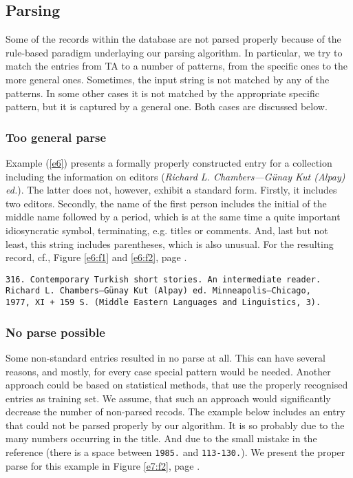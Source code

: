 \documentclass{scrartcl}
\begin{document}
\subsection{Parsing}
Some of the records within the database are not parsed properly because of the
rule-based paradigm underlaying our parsing algorithm. In particular, we try to
match the entries from TA to a number of patterns, from the specific ones to the
more general ones. Sometimes, the input string is not matched by any of the
patterns. In some other cases it is not matched by the appropriate specific
pattern, but it is captured by a general one. Both cases are discussed below.

\subsubsection{Too general parse}
Example (\ref{e6}) presents a formally properly constructed entry for a
collection including the information on editors (\emph{Richard L. Chambers—Günay
Kut (Alpay) ed.}). The latter does not, however, exhibit a standard form.
Firstly, it includes two editors. Secondly, the name of the first person includes the
initial of the middle name followed by a period, which is at the same time a
quite important idiosyncratic symbol, terminating, e.g. titles or comments. And,
last but not least, this string includes parentheses, which is also unusual. For the
resulting record, cf., Figure \ref{e6:f1} and \ref{e6:f2}, page \pageref{e6:f1}.

\begin{example}
\begin{verbatim}
316. Contemporary Turkish short stories. An intermediate reader.
Richard L. Chambers—Günay Kut (Alpay) ed. Minneapolis—Chicago, 
1977, XI + 159 S. (Middle Eastern Languages and Linguistics, 3). 
\end{verbatim}
\label{e6} 
\end{example}

\subsubsection{No parse possible}
Some non-standard entries resulted in no parse at all. This can have several
reasons, and mostly, for every case special pattern would be needed. Another
approach could be based on statistical methods, that use the properly
recognised entries as training set. We assume, that such an approach would
significantly decrease the number of non-parsed recods.
The example below includes an entry that could not be parsed properly by our
algorithm. It is so probably due to the many numbers occurring in the title. And
due to the small mistake in the reference (there is a space between \verb+1985.+ and
\verb+113-130.+). We present the proper parse for this example in Figure
\ref{e7:f2}, page \pageref{e7:f2}.
\end{document}
